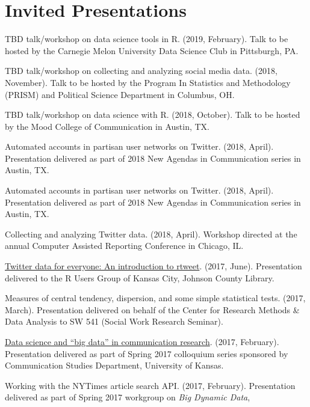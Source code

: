 \section{Invited Presentations}
  \begin{bibenum}
    \item[] TBD talk/workshop on data science tools in R. (2019, February).
      Talk to be hosted by the Carnegie Melon University Data Science Club in Pittsburgh, PA.
    \item[] TBD talk/workshop on collecting and analyzing social media data. (2018, November).
      Talk to be hosted by the Program In Statistics and Methodology (PRISM) and Political Science Department in Columbus, OH.
    \item[] TBD talk/workshop on data science with R. (2018, October).
      Talk to be hosted by the Mood College of Communication in Austin, TX.
    \item[] Automated accounts in partisan user networks on Twitter. (2018, April).
      Presentation delivered as part of 2018 New Agendas in Communication series in Austin, TX.
    \item[] Automated accounts in partisan user networks on Twitter. (2018, April).
      Presentation delivered as part of 2018 New Agendas in Communication series in Austin, TX.
    \item[] Collecting and analyzing Twitter data. (2018, April).
      Workshop directed at the annual Computer Assisted Reporting Conference in Chicago, IL.
    \item[] \href{https://mkearney.github.io/rusersKC}{Twitter data for everyone: An introduction to rtweet}. (2017, June).
      Presentation delivered to the R Users Group of Kansas City, Johnson County Library.
    \item[] Measures of central tendency, dispersion, and some simple statistical tests. (2017, March).
      Presentation delivered on behalf of the Center for Research Methods \& Data Analysis to SW 541 (Social Work Research Seminar).
    \item[]
      \href{https://mkearney.github.io/COLLOQUIUM/slides.html}{Data science and ``big data'' in communication research}. (2017, February).
      Presentation delivered as part of Spring 2017 colloquium series sponsored by Communication Studies Department, University of Kansas.
    \item[] Working with the NYTimes article search API. (2017, February).
      Presentation delivered as part of Spring 2017 workgroup on \textit{Big Dynamic Data},

\end{bibenum}
